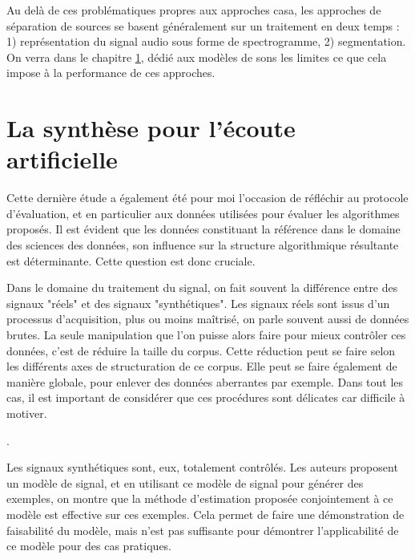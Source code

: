 Au delà de ces problématiques propres aux approches casa, les approches de séparation de sources se basent généralement sur un traitement en deux temps : 1) représentation du signal audio sous forme de spectrogramme, 2) segmentation. On verra dans le chapitre \ref{}, dédié aux modèles de sons les limites ce que cela impose à la performance de ces approches.

\section{La synthèse pour l'écoute artificielle}

Cette dernière étude a également été pour moi l'occasion de réfléchir au protocole d'évaluation, et en particulier aux données utilisées pour évaluer les algorithmes proposés. Il est évident que les données constituant la référence dans le domaine des sciences des données, son influence sur la structure algorithmique résultante est déterminante. Cette question est donc cruciale.

Dans le domaine du traitement du signal, on fait souvent la différence entre des signaux "réels" et des signaux "synthétiques". Les signaux réels sont issus d'un processus d'acquisition, plus ou moins maîtrisé, on parle souvent aussi de données brutes. La seule manipulation que l'on puisse alors faire pour mieux contrôler ces données, c'est de réduire la taille du corpus. Cette réduction peut se faire selon les différents axes de structuration de ce corpus. Elle peut se faire également de manière globale, pour enlever des données aberrantes par exemple. Dans tout les cas, il est important de considérer que ces procédures sont délicates car difficile à motiver.

.


Les signaux synthétiques sont, eux, totalement contrôlés. Les auteurs proposent un modèle de signal, et en utilisant ce modèle de signal pour générer des exemples, on montre que la méthode d'estimation proposée conjointement à ce modèle est effective sur ces exemples. Cela permet de faire une démonstration de faisabilité du modèle, mais n'est pas suffisante pour démontrer l'applicabilité de ce modèle pour des cas pratiques.

